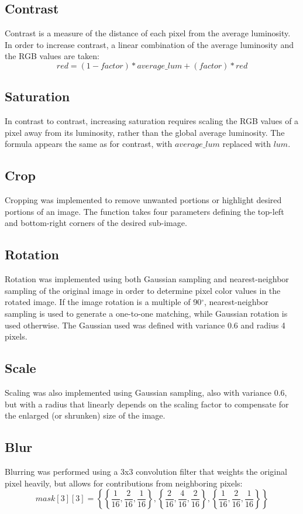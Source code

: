 \documentclass[10pt,twocolumn,twoside]{IEEEtran}
\begin{document}
\subsection{Contrast}
Contrast is a measure of the distance of each pixel from the average luminosity. In order to increase contrast,  a linear combination of the average luminosity and the RGB values are taken:
\begin{equation*} red = (1 - factor)*average\_lum + (factor)*red \end{equation*}

\subsection{Saturation}
In contrast to contrast, increasing saturation requires scaling the RGB values of a pixel away from its luminosity, rather than the global average luminosity. The formula appears the same as for contrast, with $average\_lum$ replaced with $lum$.

\subsection{Crop}
Cropping was implemented to remove unwanted portions or highlight desired portions of an image. The function takes four parameters defining the top-left and bottom-right corners of the desired sub-image.

\subsection{Rotation}
Rotation was implemented using both Gaussian sampling and nearest-neighbor sampling of the original image in order to determine pixel color values in the rotated image. If the image rotation is a multiple of 90$^\circ$, nearest-neighbor sampling is used to generate a one-to-one matching, while Gaussian rotation is used otherwise. The Gaussian used was defined with variance 0.6 and radius 4 pixels. 

\subsection{Scale}
Scaling was also implemented using Gaussian sampling, also with variance 0.6, but with a radius that linearly depends on the scaling factor to compensate for the enlarged (or shrunken) size of the image.

\subsection{Blur}
Blurring was performed using a 3x3 convolution filter that weights the original pixel heavily, but allows for contributions from neighboring pixels:
{\small{
\begin{equation*}
mask[3][3] = \left\{ \left\{\frac{1}{16}, \frac{2}{16}, \frac{1}{16}\right\}, \left\{\frac{2}{16}, \frac{4}{16}, \frac{2}{16}\right\}, \left\{\frac{1}{16}, \frac{2}{16}, \frac{1}{16}\right\} \right\}
\end{equation*}
}}
\end{document}
